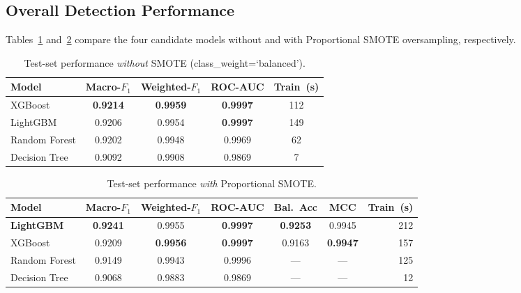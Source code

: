 \subsection{Overall Detection Performance}
\label{sec:exp-overall}

Tables~\ref{tab:results-no-smote} and~\ref{tab:results-smote} compare the four candidate models without and with Proportional SMOTE oversampling, respectively.

\begin{table}[h]
\centering
\caption{Test-set performance \emph{without} SMOTE (class\_weight=`balanced').}
\label{tab:results-no-smote}
\begin{tabular}{lcccc}
\toprule
\textbf{Model} & \textbf{Macro-$F_1$} & \textbf{Weighted-$F_1$} & \textbf{ROC-AUC} & \textbf{Train~(s)} \\
\midrule
XGBoost       & \textbf{0.9214} & \textbf{0.9959} & \textbf{0.9997} & 112 \\
LightGBM      & 0.9206          & 0.9954          & \textbf{0.9997} & 149 \\
Random Forest & 0.9202          & 0.9948          & 0.9969          &  62 \\
Decision Tree & 0.9092          & 0.9908          & 0.9869          &   7 \\
\bottomrule
\end{tabular}
\end{table}

\begin{table}[h]
\centering
\caption{Test-set performance \emph{with} Proportional SMOTE.}
\label{tab:results-smote}
\begin{tabular}{lcccccr}
\toprule
\textbf{Model} & \textbf{Macro-$F_1$} & \textbf{Weighted-$F_1$} & \textbf{ROC-AUC} & \textbf{Bal.\ Acc} & \textbf{MCC} & \textbf{Train~(s)} \\
\midrule
\textbf{LightGBM} & \textbf{0.9241} & 0.9955 & \textbf{0.9997} & \textbf{0.9253} & 0.9945 & 212 \\
XGBoost           & 0.9209          & \textbf{0.9956} & \textbf{0.9997} & 0.9163 & \textbf{0.9947} & 157 \\
Random Forest     & 0.9149          & 0.9943          & 0.9996          & ---    & ---    & 125 \\
Decision Tree     & 0.9068          & 0.9883          & 0.9869          & ---    & ---    &  12 \\
\bottomrule
\end{tabular}
\end{table}

